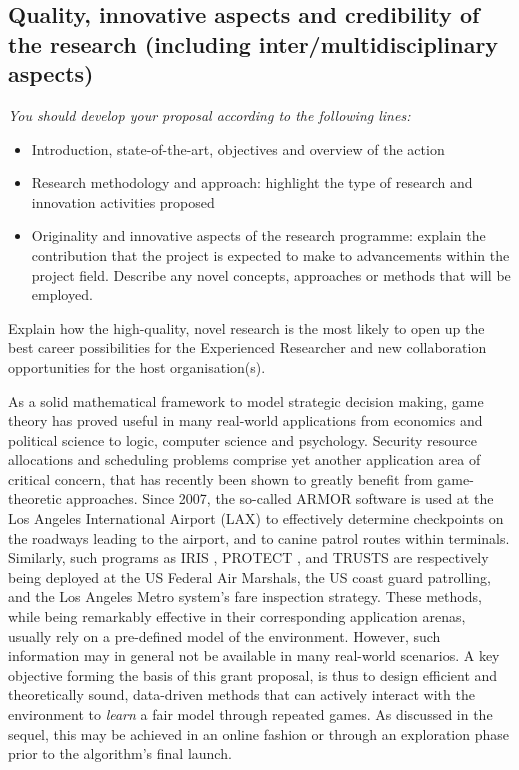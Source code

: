 \documentclass[a4paper,11pt]{article}
\renewcommand{\cite}{\autocite} %
\begin{document}
\subsection{Quality, innovative aspects and credibility of the research (including inter/multidisciplinary aspects)}
\label{sec:quality}

{\em
You should develop your proposal according to the following lines:
\begin{itemize}
\item Introduction, state-of-the-art, objectives and overview of the action
\item Research methodology and approach: highlight the type of research and innovation activities proposed
\item Originality and innovative aspects of the research programme: explain the contribution that the project is expected to make to advancements within the project field. Describe any novel concepts, approaches or methods that will be employed.
\end{itemize}
Explain how the high-quality, novel research is the most likely to open up the best career possibilities for the Experienced Researcher and new collaboration opportunities for the host organisation(s).
}

As a solid mathematical framework to model strategic decision making, game theory has proved useful in many real-world applications from economics and political science to logic, computer science and psychology. 
Security resource allocations and scheduling problems comprise yet another application area of critical concern, that has recently been shown to greatly benefit from game-theoretic approaches.
Since 2007, the so-called ARMOR software \cite{pita2008deployed} is used at the Los Angeles International Airport (LAX) to effectively determine 
checkpoints on the roadways leading to the airport, and to canine patrol routes within terminals. 
Similarly, such programs as IRIS \cite{tsai2009iris}, PROTECT \cite{shieh2012protect}, and TRUSTS \cite{yin2012trusts} are respectively being deployed at the US Federal Air Marshals, the US coast guard patrolling, and the Los Angeles Metro system's fare inspection strategy. These methods, while being remarkably effective in their corresponding application arenas, usually rely on a pre-defined model of the environment. However, such information may in general not be available in many real-world scenarios. A key objective forming the basis of this grant proposal, is thus to design efficient and theoretically sound, data-driven methods that can actively interact with the environment to {\em learn} a fair model through repeated games. As discussed in the sequel, this may be achieved in an online fashion or through an exploration phase prior to the algorithm's final launch.  
\end{document}
